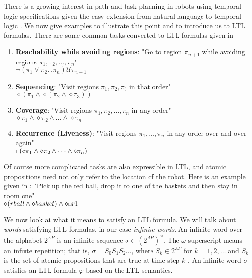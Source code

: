 There is a growing interest in path and task planning in robots using temporal logic specifications given the easy extension from natural language to temporal logic \cite{kress07}. We now give examples to illustrate this point and to introduce us to LTL formulas. There are some common tasks converted to LTL formulas given in \cite{fainekos09} 
\begin{enumerate}
    \item \textbf{Reachability while avoiding regions}: "Go to region $\pi_{n+1}$ while avoiding regions $\pi_1, \pi_2, \dots, \pi_n$" \\ $\neg(\pi_1 \lor \pi_2 \dots \pi_n) \mathcal{U} \pi_{n+1}$ 
    \item \textbf{Sequencing}: "Visit regions $\pi_1, \pi_2, \pi_3$ in that order"\\ 
    $\diamond (\pi_1 \land \diamond(\pi_2 \land \diamond \pi_3))$ 
    \item \textbf{Coverage}: "Visit regions $\pi_1, \pi_2, \dots, \pi_n$ in any order"\\ $\diamond \pi_1 \land \diamond \pi_2 \land \dots \land \diamond \pi_n$
    \item \textbf{Recurrence (Liveness)}: "Visit regions $\pi_1, \dots, \pi_n$ in any order over and over again"\\ $\ssquare(\diamond \pi_1 \land \diamond \pi_2 \land \dots \land \diamond \pi_n)$      
\end{enumerate}
Of course more complicated tasks are also expressible in LTL, and atomic propositions need not only refer to the location of the robot. Here is an example given in  \cite{guo15}: "Pick up the red ball, drop it to one of the baskets and then stay in room one" \\
$\diamond(rball \land \diamond basket) \land \diamond \ssquare r1$ 

We now look at what it means to satisfy an LTL formula. We will talk about \textit{words} satisfying LTL formulas, in our case \textit{infinite words}. An infinite word over the alphabet $2^{AP}$ is an infinite sequence $\sigma \in (2^{AP})^\omega$. The $\omega$ superscript means an infinte repetition; that is, $\sigma = S_0 S_1 S_2 \dots$, where $S_k \in 2^{AP}$ for $k=1,2,\dots$ and $S_k$ is the set of atomic propositions that are true at time step $k$ \cite{guo15}. An infinite word $\sigma$ satisfies an LTL formula $\varphi$ based on the LTL semantics.  

